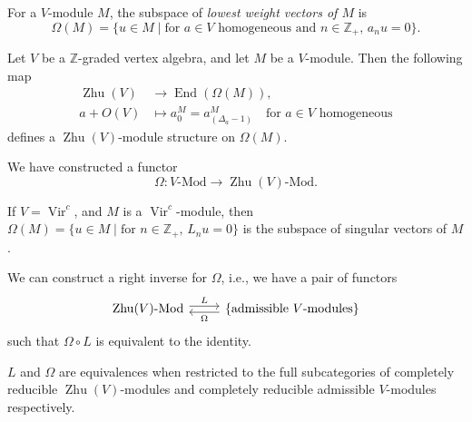\documentclass{beamer}
\DeclareMathOperator{\Vir}{Vir}
\DeclareMathOperator{\End}{End}
\DeclareMathOperator{\Zhu}{Zhu}
\begin{document}
\begin{frame}
  For a $V$-module $M$, the subspace of \emph{lowest weight vectors of $M$} is
  \begin{equation*}
    \Omega(M) = \{u \in M \mid \text{for $a \in V$ homogeneous and $n \in \mathbb{Z}_+$, $a_nu = 0$}\}.
  \end{equation*}

  \begin{theorem}
    \label{thr:6}
    Let $V$ be a $\mathbb{Z}$-graded vertex algebra, and let $M$ be a $V$-module.
    Then the following map
    \begin{align*}
      \Zhu(V) &\to \End(\Omega(M)), \\
      a + O(V) &\mapsto a^M_0 = a^M_{(\Delta_a - 1)} \quad \text{for $a \in V$ homogeneous}
    \end{align*}
    defines a $\Zhu(V)$-module structure on $\Omega(M)$.
  \end{theorem}

  We have constructed a functor
  \begin{equation*}
    \Omega: \text{$V$-Mod} \to \text{$\Zhu(V)$-Mod}.
  \end{equation*}
\end{frame}

\begin{frame}[fragile]
  \begin{example}
    \label{exa:5}
    If $V = \Vir^c$, and $M$ is a $\Vir^c$-module, then $\Omega(M) = \{u \in M \mid \text{for $n \in \mathbb{Z}_+$, $L_nu = 0$}\}$ is the subspace of singular vectors of $M$.
  \end{example}

  We can construct a right inverse for $\Omega$, i.e., we have a pair of functors
  \begin{equation*}
    \begin{tikzcd}
      \text{$\Zhu(V)$-Mod} \arrow[r, "L", shift left] & \{\text{admissible $V$-modules}\} \arrow[l, "\Omega", shift left]
    \end{tikzcd}
  \end{equation*}
  such that $\Omega\circ L$ is equivalent to the identity.

  \begin{theorem}
    \label{thr:7}
    $L$ and $\Omega$ are equivalences when restricted to the full subcategories of completely reducible $\Zhu(V)$-modules and completely reducible admissible $V$-modules respectively.
  \end{theorem}
\end{frame}
\end{document}
